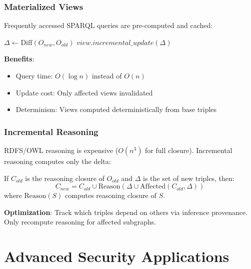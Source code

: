 \subsubsection{Materialized Views}

Frequently accessed SPARQL queries are pre-computed and cached:

\begin{algorithm}
\caption{Materialized View Maintenance}
\begin{algorithmic}[1]
    \State $\Delta \gets \text{Diff}(O_{new}, O_{old})$
            \State $view.incremental\_update(\Delta)$
        \EndIf
    \EndFor
\EndProcedure
\end{algorithmic}
\end{algorithm}

\textbf{Benefits}:
\begin{itemize}
    \item Query time: $O(\log n)$ instead of $O(n)$
    \item Update cost: Only affected views invalidated
    \item Determinism: Views computed deterministically from base triples
\end{itemize}

\subsubsection{Incremental Reasoning}

RDFS/OWL reasoning is expensive ($O(n^3)$ for full closure). Incremental reasoning computes only the delta:

\begin{theorem}
    If $C_{old}$ is the reasoning closure of $O_{old}$ and $\Delta$ is the set of new triples, then:
    \begin{equation}
        C_{new} = C_{old} \cup \text{Reason}(\Delta \cup \text{Affected}(C_{old}, \Delta))
    \end{equation}
    where $\text{Reason}(S)$ computes reasoning closure of $S$.
\end{theorem}

\textbf{Optimization}: Track which triples depend on others via inference provenance. Only recompute reasoning for affected subgraphs.

\section{Advanced Security Applications}

